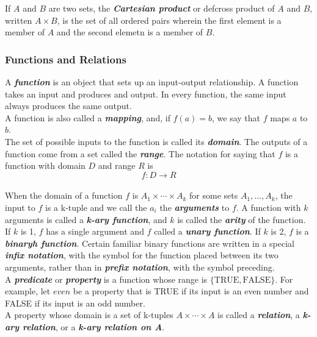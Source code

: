 \documentclass{article}
\theoremstyle{definition}
\newcommand{\define}[1]{\textbf{\textit{#1}}}
\begin{document}
If $A$ and $B$ are two sets, the \define{Cartesian product} or def{cross product} of $A$ and $B$, written $A \times B$, is the set of all ordered pairs wherein the first element is a member of $A$ and the second elemetn is a member of $B$. 

\subsubsection{Functions and Relations} 

A \define{function} is an object that sets up an input-output relationship. A function takes an input and produces and output. In every function, the same input always produces the same output. \\ 

A function is also called a \define{mapping}, and, if $f(a) = b$, we say that $f$ maps $a$ to $b$. \\ 

The set of possible inputs to the function is called its \define{domain}. The outputs of a function come from a set called the \define{range}. The notation for saying that $f$ is a function with domain $D$ and range $R$ is $$f: D \rightarrow R$$ \\ 

When the domain of a function $f$ is $A_{1} \times \cdots \times A_{k}$ for some sets $A_{1}, \dots, A_{k}$, the input to $f$ is a k-tuple and we call the $a_i$ the \define{arguments} to $f$. A function with $k$ arguments is called a \define{k-ary function}, and $k$ is called the \define{arity} of the function. If $k$ is 1, $f$ has a single argument and $f$ called a \define{unary function}. If $k$ is 2, $f$ is a \define{binaryh function}. Certain familiar binary functions are written in a special \define{infix notation}, with the symbol for the function placed between its two arguments, rather than in \define{prefix notation}, with the symbol preceding. \\ 

A \define{predicate} or \define{property} is a function whose range is $\{\textrm{TRUE}, \textrm{FALSE}\}$. For example, let $even$ be a property that is TRUE if its input is an even number and FALSE if its input is an odd number. \\ 

A property whose domain is a set of k-tuples $A \times \cdots \times A$ is called a \define{relation}, a \define{k-ary relation}, or a \define{k-ary relation on A}. \\
\end{document}
